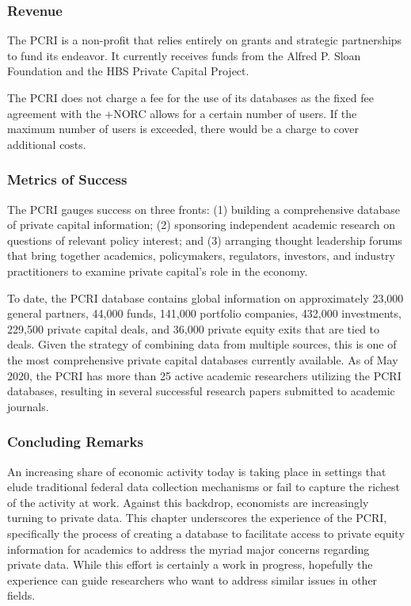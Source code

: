 \documentclass[
]{WileySix}
\begin{document}
\hypertarget{revenue-2}{%
\subsubsection{Revenue}\label{revenue-2}}

The PCRI is a non-profit that relies entirely on grants and strategic partnerships to fund its endeavor. It currently receives funds from the Alfred P. Sloan Foundation and the HBS Private Capital Project.

The PCRI does not charge a fee for the use of its databases as the fixed fee agreement with the +NORC\textbar{} allows for a certain number of users. If the maximum number of users is exceeded, there would be a charge to cover additional costs.

\hypertarget{metrics-of-success-3}{%
\subsubsection{Metrics of Success}\label{metrics-of-success-3}}

The PCRI gauges success on three fronts: (1) building a comprehensive database of private capital information; (2) sponsoring independent academic research on questions of relevant policy interest; and (3) arranging thought leadership forums that bring together academics, policymakers, regulators, investors, and industry practitioners to examine private capital's role in the economy.

To date, the PCRI database contains global information on approximately 23,000 general partners, 44,000 funds, 141,000 portfolio companies, 432,000 investments, 229,500 private capital deals, and 36,000 private equity exits that are tied to deals. Given the strategy of combining data from multiple sources, this is one of the most comprehensive private capital databases currently available. As of May 2020, the PCRI has more than 25 active academic researchers utilizing the PCRI databases, resulting in several successful research papers submitted to academic journals.

\hypertarget{concluding-remarks}{%
\subsubsection{Concluding Remarks}\label{concluding-remarks}}

An increasing share of economic activity today is taking place in settings that elude traditional federal data collection mechanisms or fail to capture the richest of the activity at work. Against this backdrop, economists are increasingly turning to private data. This chapter underscores the experience of the PCRI, specifically the process of creating a database to facilitate access to private equity information for academics to address the myriad major concerns regarding private data. While this effort is certainly a work in progress, hopefully the experience can guide researchers who want to address similar issues in other fields.
\end{document}
